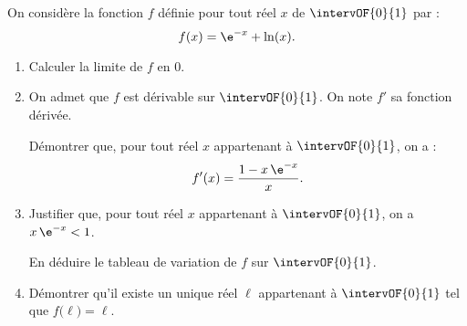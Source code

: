 On considère la fonction $f$ définie pour tout réel $x$ de $\intervOF{0}{1}$ par : \[ f(x)=\e^{-x} + \ln(x). \]
%
\begin{enumerate}
	\item Calculer la limite de $f$ en $0$.
	\item On admet que $f$ est dérivable sur $\intervOF{0}{1}$. On note $f'$ sa fonction dérivée.
	
	Démontrer que, pour tout réel $x$ appartenant à $\intervOF{0}{1}$, on a : \[ f'(x)=\dfrac{1-x\,\e^{-x}}{x}. \]
	\item Justifier que, pour tout réel $x$ appartenant à $\intervOF{0}{1}$, on a $x\,\e^{-x}<1$.
	
	En déduire le tableau de variation de $f$ sur $\intervOF{0}{1}$.
	\item Démontrer qu'il existe un unique réel $\ell$ appartenant à $\intervOF{0}{1}$ tel que $f\big(\ell\big) = \ell$.
\end{enumerate}

